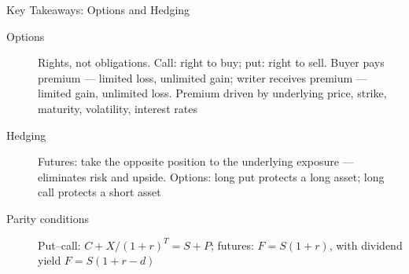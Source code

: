 \documentclass[aspectratio=169]{beamer}
\begin{document}
\begin{frame}{Key Takeaways: Options and Hedging}
\begin{description}
  \item[Options] Rights, not obligations. Call: right to buy; put: right to sell. Buyer pays premium --- limited loss, unlimited gain; writer receives premium --- limited gain, unlimited loss. Premium driven by underlying price, strike, maturity, volatility, interest rates
  \item[Hedging] Futures: take the opposite position to the underlying exposure --- eliminates risk and upside. Options: long put protects a long asset; long call protects a short asset
  \item[Parity conditions] Put--call: $C + X/(1+r)^T = S + P$; futures: $F = S(1+r)$, with dividend yield $F = S(1+r-d)$
\end{description}
\end{frame}
\end{document}
